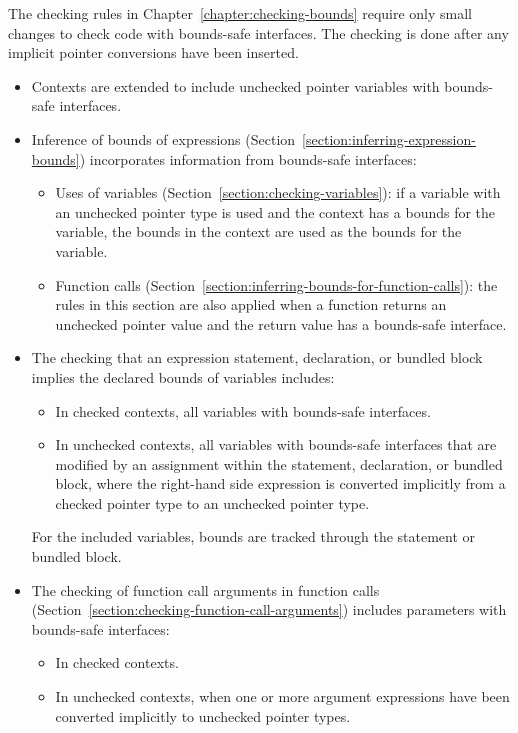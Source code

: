 The checking rules in Chapter~\ref{chapter:checking-bounds} require
only small changes to check code with bounds-safe interfaces.  The
checking is done after any implicit pointer conversions have been
inserted.
\begin{itemize}
\item Contexts are extended to include unchecked pointer variables with
      bounds-safe interfaces.
\item Inference of bounds of expressions (Section~\ref{section:inferring-expression-bounds}) incorporates information from bounds-safe interfaces:
\begin{itemize}
\item Uses of variables (Section~\ref{section:checking-variables}): 
      if a variable with an unchecked pointer type is used and the context has
      a bounds for the variable, the bounds in the context are used as the bounds
      for the variable.
\item Function calls (Section~\ref{section:inferring-bounds-for-function-calls}): 
      the rules in this section are also applied when a function returns an unchecked
      pointer value and the return value has a bounds-safe interface.
\end{itemize}
\item The checking that an expression statement, declaration, or bundled
      block implies the declared bounds of variables includes:
\begin{itemize}
\item In checked contexts, all variables with bounds-safe interfaces.
\item In unchecked contexts, all variables with bounds-safe interfaces
      that are modified by an assignment within the statement, declaration,
      or bundled block, where the right-hand side expression
      is converted implicitly from a checked pointer type to an unchecked pointer type.
\end{itemize}
For the included variables, bounds are tracked through the statement or
bundled block.
\item The checking of function call arguments
      in function calls (Section~\ref{section:checking-function-call-arguments})
      includes parameters with bounds-safe interfaces:
\begin{itemize}
\item In checked contexts.
\item In unchecked contexts, when one or more argument expressions have been
      converted implicitly to unchecked pointer types.

\end{itemize}
\end{itemize}
